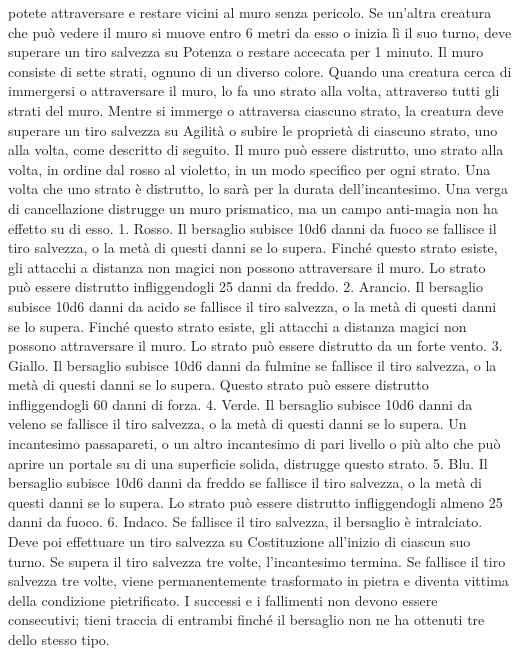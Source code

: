 \begin{multicols}{2}
potete attraversare e restare vicini al muro senza
pericolo. Se un’altra creatura che può vedere il muro si
muove entro 6 metri da esso o inizia lì il suo turno, deve
superare un tiro salvezza su Potenza o restare
accecata per 1 minuto.
Il muro consiste di sette strati, ognuno di un diverso
colore. Quando una creatura cerca di immergersi o
attraversare il muro, lo fa uno strato alla volta,
attraverso tutti gli strati del muro. Mentre si immerge o
attraversa ciascuno strato, la creatura deve superare un
tiro salvezza su Agilità o subire le proprietà di
ciascuno strato, uno alla volta, come descritto di
seguito.
Il muro può essere distrutto, uno strato alla volta, in
ordine dal rosso al violetto, in un modo specifico per
ogni strato. Una volta che uno strato è distrutto, lo sarà
per la durata dell’incantesimo. Una verga di
cancellazione distrugge un muro prismatico, ma un
campo anti-magia non ha effetto su di esso.
1. Rosso. Il bersaglio subisce 10d6 danni da fuoco se
fallisce il tiro salvezza, o la metà di questi danni se lo
supera. Finché questo strato esiste, gli attacchi a
distanza non magici non possono attraversare il muro. 
Lo strato può essere distrutto infliggendogli 25 danni da
freddo.
2. Arancio. Il bersaglio subisce 10d6 danni da acido se
fallisce il tiro salvezza, o la metà di questi danni se lo
supera. Finché questo strato esiste, gli attacchi a
distanza magici non possono attraversare il muro. Lo
strato può essere distrutto da un forte vento.
3. Giallo. Il bersaglio subisce 10d6 danni da fulmine se
fallisce il tiro salvezza, o la metà di questi danni se lo
supera. Questo strato può essere distrutto infliggendogli
60 danni di forza.
4. Verde. Il bersaglio subisce 10d6 danni da veleno se
fallisce il tiro salvezza, o la metà di questi danni se lo
supera. Un incantesimo passapareti, o un altro
incantesimo di pari livello o più alto che può aprire un
portale su di una superficie solida, distrugge questo
strato.
5. Blu. Il bersaglio subisce 10d6 danni da freddo se
fallisce il tiro salvezza, o la metà di questi danni se lo
supera. Lo strato può essere distrutto infliggendogli
almeno 25 danni da fuoco.
6. Indaco. Se fallisce il tiro salvezza, il bersaglio è
intralciato. Deve poi effettuare un tiro salvezza su
Costituzione all’inizio di ciascun suo turno. Se supera il
tiro salvezza tre volte, l’incantesimo termina. Se fallisce
il tiro salvezza tre volte, viene permanentemente
trasformato in pietra e diventa vittima della condizione
pietrificato. I successi e i fallimenti non devono essere
consecutivi; tieni traccia di entrambi finché il bersaglio
non ne ha ottenuti tre dello stesso tipo.

\end{multicols}

